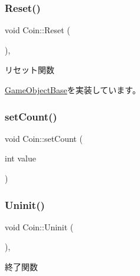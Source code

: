 \mbox{\label{class_coin_a52c50229ce7c1e0f459e198adac70c8d}} 
\subsubsection{\texorpdfstring{Reset()}{Reset()}}
{\footnotesize\ttfamily void Coin\+::\+Reset (\begin{DoxyParamCaption}{ }\end{DoxyParamCaption})\hspace{0.3cm}{\ttfamily [override]}, {\ttfamily [virtual]}}



リセット関数 



\mbox{\hyperlink{class_game_object_base_a85c59554f734bcb09f1a1e18d9517dce}{Game\+Object\+Base}}を実装しています。

\mbox{\label{class_coin_acb3027a1a45470723b7952c73af69878}} 
\subsubsection{\texorpdfstring{set\+Count()}{setCount()}}
{\footnotesize\ttfamily void Coin\+::set\+Count (\begin{DoxyParamCaption}\item[{int}]{value }\end{DoxyParamCaption})\hspace{0.3cm}{\ttfamily [inline]}}

\mbox{\label{class_coin_a4d364dcb4b57b80ea00ce931d0bb300f}} 
\subsubsection{\texorpdfstring{Uninit()}{Uninit()}}
{\footnotesize\ttfamily void Coin\+::\+Uninit (\begin{DoxyParamCaption}{ }\end{DoxyParamCaption})\hspace{0.3cm}{\ttfamily [override]}, {\ttfamily [virtual]}}



終了関数 



